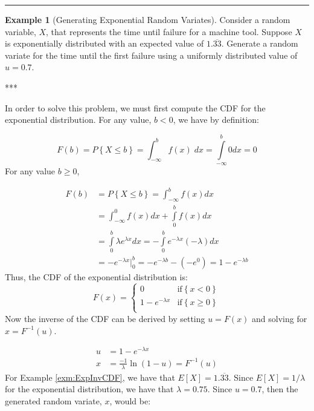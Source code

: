 \documentclass[
]{book}
\theoremstyle{definition}
\theoremstyle{definition}
\newtheorem{example}{Example}[chapter]
\theoremstyle{definition}
\theoremstyle{definition}
\theoremstyle{remark}
\begin{document}
\begin{center}\rule{0.5\linewidth}{0.5pt}\end{center}

\begin{example}[Generating Exponential Random Variates]
\protect\hypertarget{exm:ExpInvCDF}{}{\label{exm:ExpInvCDF} {} }Consider a random variable, \(X\), that represents the time until failure for a machine tool. Suppose \(X\) is exponentially distributed with an expected value of \(1.\overline{33}\). Generate a random variate for the time until the first failure using a uniformly distributed value of \(u = 0.7\).
\end{example}
***

In order to solve this problem, we must first compute the CDF for the exponential distribution. For any value, \(b < 0\), we have by definition:

\[
F(b) = P\left\{X \le b \right\} = \int_{ - \infty }^b f(x)\;dx = \int\limits_{ - \infty }^b {0 dx} = 0
\]
For any value \(b \geq 0\),

\[
\begin{split}
F(b) & =  P\left\{X \le b \right\} = \int_{ - \infty }^b f(x)dx\\
 &  =  \int_{ - \infty }^0 f(x)dx +  \int\limits_0^b f(x)dx \\
 & =  \int\limits_{0}^{b} \lambda e^{\lambda x}dx = - \int\limits_{0}^{b} e^{-\lambda x}(-\lambda)dx\\
 & =  -e^{-\lambda x} \bigg|_{0}^{b} = -e^{-\lambda b} - (-e^{0}) = 1 - e^{-\lambda b}
 \end{split}
\]
Thus, the CDF of the exponential distribution is:
\[
F(x) =
\begin{cases}
0 & \text{if} \left\{x < 0 \right\}\\
1 - e^{-\lambda x} & \text{if} \left\{x \geq 0\right\}\\
\end{cases}
\]
Now the inverse of the CDF can be derived by setting
\(u = F(x)\) and solving for \(x = F^{-1}(u)\).

\[
\begin{split}
u & = 1 - e^{-\lambda x}\\
x & = \frac{-1}{\lambda}\ln \left(1-u \right) = F^{-1}(u)
\end{split}
\]
For Example \ref{exm:ExpInvCDF}, we have that \(E[X]= 1.\overline{33}\). Since \(E\left[X\right] = 1/\lambda\) for the exponential distribution, we have that \(\lambda = 0.75\). Since \(u=0.7\), then the generated random variate, \(x\), would be:
\end{document}
